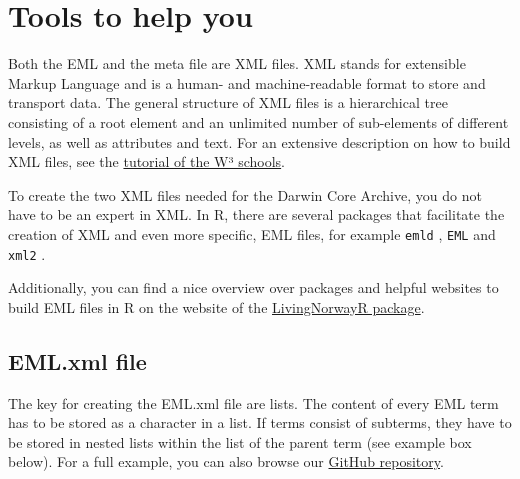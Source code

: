 \documentclass[
  oneside]{book}
\begin{document}
\section{Tools to help you}\label{tools-to-help-you-5}

Both the EML and the meta file are XML files. XML stands for extensible Markup Language and is a human- and machine-readable format to store and transport data. The general structure of XML files is a hierarchical tree consisting of a root element and an unlimited number of sub-elements of different levels, as well as attributes and text. For an extensive description on how to build XML files, see the \href{https://www.w3schools.com/xml/default.asp}{tutorial of the W³ schools}.

To create the two XML files needed for the Darwin Core Archive, you do not have to be an expert in XML. In R, there are several packages that facilitate the creation of XML and even more specific, EML files, for example \texttt{emld} \autocite{R-emld}, \texttt{EML} \autocite{R-EML} and \texttt{xml2} \autocite{R-xml2}.

Additionally, you can find a nice overview over packages and helpful websites to build EML files in R on the website of the \href{https://livingnorway.github.io/LivingNorwayR/articles/EML_R_packages_overview.html}{LivingNorwayR package}.

\subsection{EML.xml file}\label{eml.xml-file}

The key for creating the EML.xml file are lists. The content of every EML term has to be stored as a character in a list. If terms consist of subterms, they have to be stored in nested lists within the list of the parent term (see example box below). For a full example, you can also browse our \href{https://github.com/LTER-LIFE/FDFDT}{GitHub repository}.
\end{document}
